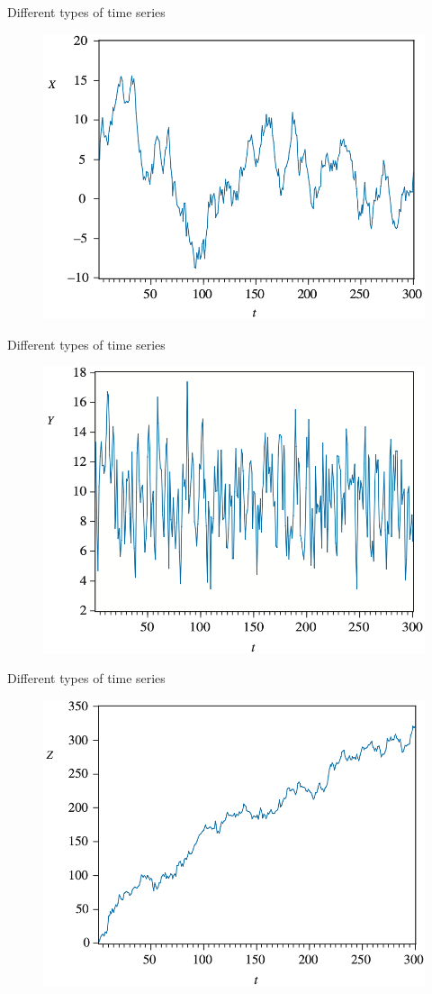 \documentclass[10pt,aspectratio=169]{beamer}  %
\begin{document}
\begin{frame}{Different types of time series}

    \bigskip
    \begin{figure}[H]
        \centering
        \includegraphics[height=0.4\textwidth]{./fig/random-walk.png}
    \end{figure}

\end{frame}


\begin{frame}{Different types of time series}

    \bigskip
    \begin{figure}[H]
        \centering
        \includegraphics[height=0.4\textwidth]{./fig/autoregressive.png}
    \end{figure}

\end{frame}


\begin{frame}{Different types of time series}

    \bigskip
    \begin{figure}[H]
        \centering
        \includegraphics[height=0.4\textwidth]{./fig/random-walk-with-trend.png}
    \end{figure}

\end{frame}
\end{document}
